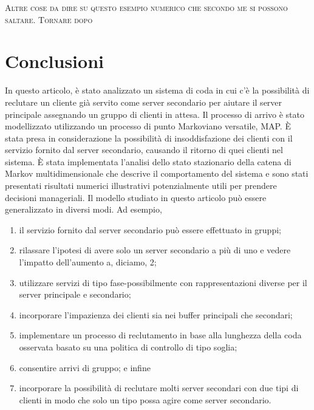 \documentclass[11pt]{article}
\begin{document}
\vspace{0.4cm}

\noindent \textsc{Altre cose da dire su questo esempio numerico che secondo me si possono saltare. Tornare dopo}

\clearpage
\section{Conclusioni}
In questo articolo, è stato analizzato un sistema di coda in cui c'è la possibilità di reclutare un cliente già servito come server secondario per aiutare il server principale assegnando un gruppo di clienti in attesa. Il processo di arrivo è stato modellizzato utilizzando un processo di punto Markoviano versatile, MAP. È stata presa in considerazione la possibilità di insoddisfazione dei clienti con il servizio fornito dal server secondario, causando il ritorno di quei clienti nel sistema. È stata implementata l'analisi dello stato stazionario della catena di Markov multidimensionale che descrive il comportamento del sistema e sono stati presentati risultati numerici illustrativi potenzialmente utili per prendere decisioni manageriali.
Il modello studiato in questo articolo può essere generalizzato in diversi modi. Ad esempio,
\begin{enumerate}
    \item il servizio fornito dal server secondario può essere effettuato in gruppi;
    \item  rilassare l'ipotesi di avere solo un server secondario a più di uno e vedere l'impatto dell'aumento a, diciamo, 2;
    \item  utilizzare servizi di tipo fase-possibilmente con rappresentazioni diverse per il server principale e secondario;
    \item incorporare l'impazienza dei clienti sia nei buffer principali che secondari;
    \item  implementare un processo di reclutamento in base alla lunghezza della coda osservata basato su una politica di controllo di tipo soglia;
    \item  consentire arrivi di gruppo; e infine
    \item  incorporare la possibilità di reclutare molti server secondari con due tipi di clienti in modo che solo un tipo possa agire come server secondario.
\end{enumerate}
\end{document}
